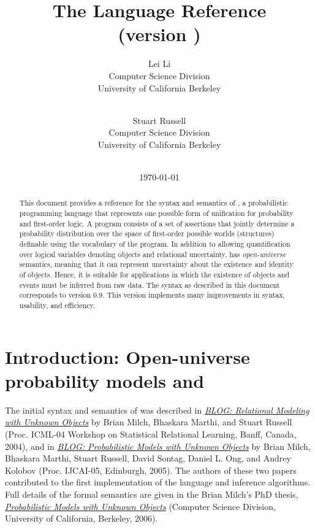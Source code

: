 \documentclass[12pt]{article}
\title{The \bl Language Reference  \\
{\large (\bl version \blogversion)}
}
\author{Lei Li\\
              Computer Science Division\\
              University of California Berkeley\\
               \email{leili@cs.berkeley.edu}\\
\and
               Stuart Russell\\
              Computer Science Division\\
              University of California Berkeley\\
               \email{russell@cs.berkeley.edu}\\
}
\date{\today}
\newcommand{\blogversion}{0.9\xspace}
\begin{document}
\maketitle


\begin{abstract}
This document provides a reference for the syntax and semantics of \bl, a probabilistic programming language
that represents one possible form of unification for probability and first-order logic.
A \bl program consists of a set of assertions that jointly determine a probability distribution
over the space of first-order possible worlds (structures) definable using the vocabulary of
the program. In addition to allowing quantification over logical variables denoting objects and relational uncertainty,
\bl has {\em open-universe} semantics, meaning that it can represent uncertainty about the existence and
identity of objects. Hence, it is suitable for applications in which the existence of objects and events must be inferred from raw data.
The syntax as described in this document corresponds to \bl version \blogversion. This version implements many
improvements in syntax, usability, and efficiency.
\end{abstract}

\clearpage

\tableofcontents

\clearpage

\section{Introduction: Open-universe probability models and \bl}\label{intro-section}

The initial syntax and semantics of \bl was described in 
\href{http://www.cs.berkeley.edu/~russell/papers/srl04-blog.pdf}{{\it BLOG: Relational Modeling with Unknown Objects}}
by Brian Milch, Bhaskara Marthi, and Stuart Russell (Proc. ICML-04 Workshop on Statistical Relational Learning, Banff, Canada, 2004),
and in 
\href{http://www.cs.berkeley.edu/~russell/papers/ijcai05-blog.pdf}{{\it BLOG: Probabilistic Models with Unknown Objects}}
by Brian Milch, Bhaskara Marthi, Stuart Russell, David Sontag, Daniel L. Ong, and Andrey Kolobov (Proc. IJCAI-05, Edinburgh, 2005).
The authors of these two papers contributed to the first implementation of the \bl language and inference algorithms.
Full details of the formal semantics are given in the Brian Milch's PhD thesis,
\href{https://sites.google.com/site/bmilch/papers/milch_thesis.pdf}{{\it Probabilistic Models with Unknown Objects}} (Computer Science Division, University of California, Berkeley, 2006).
\end{document}
